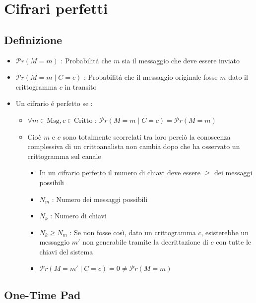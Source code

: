 \chapter{Cifrari perfetti}
\section{Definizione}

\begin{itemize}
    \item $\mathcal{P}r(M = m)$ : Probabilit\'a che $m$ sia il messaggio che deve essere inviato
    \item $\mathcal{P}r(M = m \mid C = c)$ : Probabilit\'a che il messaggio originale fosse $m$ dato il crittogramma $c$ in transito
    \item Un cifrario \'e perfetto se :
    \begin{itemize}
        \item $\forall m \in \text{Msg}, c \in \text{Critto}$ : $\mathcal{P}r(M = m \mid C = c) = \mathcal{P}r(M = m)$
        \item Cio\`e $m$ e $c$ sono totalmente scorrelati tra loro perci\`o la conoscenza complessiva di un crittoanalista non cambia dopo che ha osservato un crittogramma sul canale
        \begin{itemize}
            \item In un cifrario perfetto il numero di chiavi deve essere $\geq$ dei messaggi possibili
            \item $N_m$ : Numero dei messaggi possibili
            \item $N_k$ : Numero di chiavi
            \item $N_k \geq N_m$ : Se non fosse cos\`i, dato un crittogramma $c$, esisterebbe un messaggio $m'$ non generabile tramite la decrittazione di $c$ con tutte le chiavi del sistema
            \item $\mathcal{P}r(M = m' \mid C = c) = 0 \not= \mathcal{P}r(M = m)$
        \end{itemize}
    \end{itemize}
\end{itemize}
\section{One-Time Pad}

